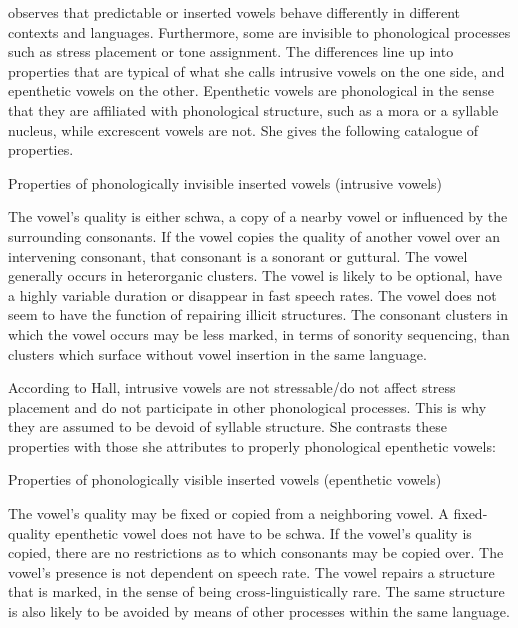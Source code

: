 \documentclass[output=paper,colorlinks,citecolor=brown]{langscibook}
\begin{document}
 observes that predictable or inserted vowels behave differently in different contexts and languages. Furthermore, some are invisible to phonological processes such as stress placement or tone assignment. The differences line up into properties that are typical of what she calls intrusive vowels on the one side, and epenthetic vowels on the other. Epenthetic vowels are phonological in the sense that they are affiliated with phonological structure, such as a mora or a syllable nucleus, while excrescent vowels are not. She gives the following catalogue of properties. 

\begin{exe}
    \ex Properties of phonologically invisible inserted vowels (intrusive vowels) \citep[391]{Hall2006}
    \begin{xlist}
        \ex The vowel’s quality is either schwa, a copy of a nearby vowel or influenced by the surrounding consonants.
        \ex If the vowel copies the quality of another vowel over an intervening consonant, that consonant is a sonorant or guttural.
        \ex The vowel generally occurs in heterorganic clusters.
        \ex \label{ex4d}The vowel is likely to be optional, have a highly variable duration or disappear in fast speech rates.
        \ex The vowel does not seem to have the function of repairing illicit structures. The consonant clusters in which the vowel occurs may be less marked, in terms of sonority sequencing, than clusters which surface without vowel insertion in the same language.
    \end{xlist}
\end{exe}

According to Hall, intrusive vowels are not stressable/do not affect stress placement and do not participate in other phonological processes. This is why they are assumed to be devoid of syllable structure. She contrasts these properties with those she attributes to properly phonological epenthetic vowels:

\begin{exe}
    \ex Properties of phonologically visible inserted vowels (epenthetic vowels) \citep[391]{Hall2006}
    \begin{xlist}
        \ex The vowel’s quality may be fixed or copied from a neighboring vowel. A fixed-quality epenthetic vowel does not have to be schwa.
        \ex If the vowel’s quality is copied, there are no restrictions as to which consonants may be copied over.
        \ex The vowel’s presence is not dependent on speech rate.
        \ex The vowel repairs a structure that is marked, in the sense of being cross-linguistically rare. The same structure is also likely to be avoided by means of other processes within the same language. 
    \end{xlist}
\end{exe}
\end{document}
